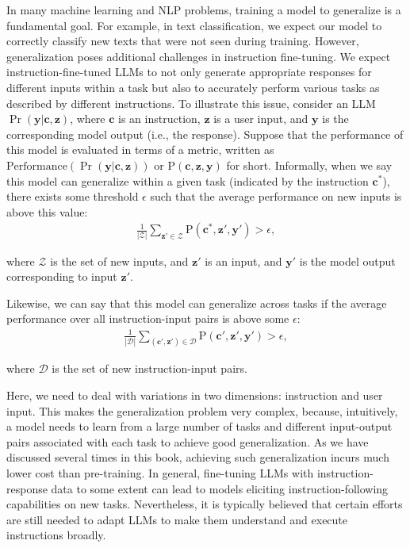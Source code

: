 In many machine learning and NLP problems, training a model to generalize is a fundamental goal. For example, in text classification, we expect our model to correctly classify new texts that were not seen during training. However, generalization poses additional challenges in instruction fine-tuning. We expect instruction-fine-tuned LLMs to not only generate appropriate responses for different inputs within a task but also to accurately perform various tasks as described by different instructions. To illustrate this issue, consider an LLM $\Pr(\mathbf{y}|\mathbf{c},\mathbf{z})$, where $\mathbf{c}$ is an instruction, $\mathbf{z}$ is a user input, and $\mathbf{y}$ is the corresponding model output (i.e., the response). Suppose that the performance of this model is evaluated in terms of a metric, written as $\mathrm{Performance}(\Pr(\mathbf{y}|\mathbf{c},\mathbf{z}))$ or $\mathrm{P}(\mathbf{c},\mathbf{z},\mathbf{y})$ for short. Informally, when we say this model can generalize within a given task (indicated by the instruction $\mathbf{c}^*$), there exists some threshold $\epsilon$ such that the average performance on new inputs is above this value:
\begin{eqnarray}
\frac{1}{|\mathcal{Z}|} \sum_{\mathbf{z}'\in \mathcal{Z}} \mathrm{P}(\mathbf{c}^*,\mathbf{z}',\mathbf{y}') > \epsilon,
\end{eqnarray}

\noindent where $\mathcal{Z}$ is the set of new inputs, and $\mathbf{z}'$ is an input, and $\mathbf{y}'$ is the model output corresponding to input $\mathbf{z}'$.

Likewise, we can say that this model can generalize across tasks if the average performance over all instruction-input pairs is above some $\epsilon$:
\begin{eqnarray}
\frac{1}{|\mathcal{D}|} \sum_{(\mathbf{c}',\mathbf{z}') \in \mathcal{D}} \mathrm{P}(\mathbf{c}',\mathbf{z}',\mathbf{y}') > \epsilon,
\end{eqnarray}

\noindent where $\mathcal{D}$ is the set of new instruction-input pairs.


Here, we need to deal with variations in two dimensions: instruction and user input. This makes the generalization problem very complex, because, intuitively, a model needs to learn from a large number of tasks and different input-output pairs associated with each task to achieve good generalization. As we have discussed several times in this book, achieving such generalization incurs much lower cost than pre-training. In general, fine-tuning LLMs with instruction-response data to some extent can lead to models eliciting instruction-following capabilities on new tasks. Nevertheless, it is typically believed that certain efforts are still needed to adapt LLMs to make them understand and execute instructions broadly.

